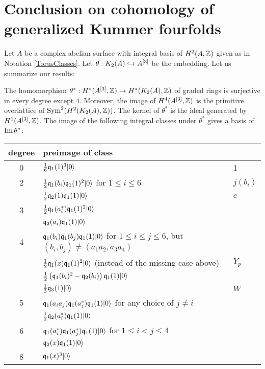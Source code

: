 \section[Conclusion on cohomology of generalized Kummer fourfolds]{Conclusion on cohomology of generalized Kummer fourfolds %
}
Let $A$ be a complex abelian surface with integral basis of $H^2(A,\Z)$ given as in Notation \ref{TorusClasses}. Let $\theta: \kum{A}{2}\hookrightarrow A\hilb{3}$ be the embedding. 
Let us summarize our results:
\begin{theorem}\label{thetaTheorem}
The homomorphism $\theta^*:H^*(A\hilb{3},\Z)\rightarrow H^*(\kum{A}{2},\Z)$ of graded rings is surjective in every degree except $4$. Moreover, the image of $H^4(A\hilb{3},\Z)$ is the primitive overlattice of $\Sym^2(H^2(\kum{A}{2},\Z))$. 
The kernel of $\theta^*$ is the ideal generated by $H^1(A\hilb{3},\Z)$.
The image of the following integral classes under $\theta^*$ gives a basis of $\im\theta^*$:
\begin{center}
\begin{tabular}{c|l|l}
degree & preimage of class & \\
\hline
0 & $\frac{1}{6} \q_1(1)^3\vac$ & 1 \\
\hline
2 &  $\frac{1}{2}\q_1(b_i) \q_1(1)^2\vac$ for $1\leq i\leq 6$ & $j(b_i)$ \\
 & $\frac{1}{2} \q_2(1)\q_1(1)\vac $  & $e$\\
\hline
3 & $\frac{1}{2}\q_1(a^*_i)\q_1(1)^2\vac$ & \\
  & $\q_2(a_i)\q_1(1)\vac$ & \\
\hline
4 & $\q_1(b_i)\q_1(b_j)\q_1(1)\vac$ for $1\leq i\leq j\leq 6$, but $(b_i,b_j)\neq(a_1a_2,a_3a_4)$ &\\
  & $\frac{1}{2}\q_1(x)\q_1(1)^2\vac$ (instead of the missing case above)  & $Y_p$\\
  & $\frac{1}{2}\left(\q_1(b_i)^2-\q_2(b_i)\right)\q_1(1)\vac$ & \\
  & $\frac{1}{3} \q_3(1)\vac$ & $W$ \\
\hline
5 & $\q_1(a_ia_j)\q_1(a_j^*)\q_1(1) \vac$ for any choice of $j\neq i$ &\\
  & $\frac{1}{2} \q_2(a^*_i)\q_1(1)\vac $ &\\
\hline
6 & $\q_1(a_i^*)\q_1(a_j^*)\q_1(1)\vac$ for $1\leq i< j\leq 4$ & \\
  & $\q_2(x)\q_1(1)\vac$ & \\
\hline
8 & $\q_1(x)^3\vac$ &
\end{tabular}
\end{center}
\end{theorem}
